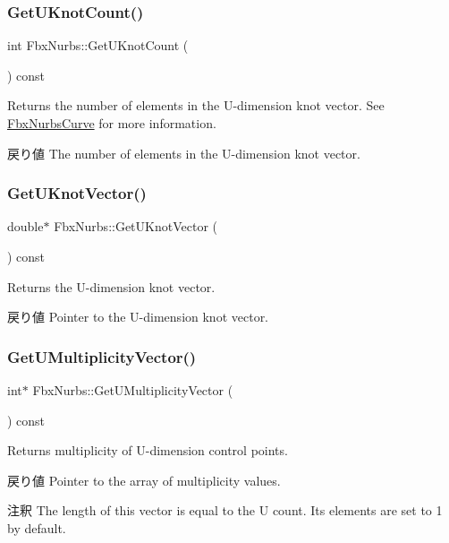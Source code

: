 \subsubsection{\texorpdfstring{Get\+U\+Knot\+Count()}{GetUKnotCount()}}
{\footnotesize\ttfamily int Fbx\+Nurbs\+::\+Get\+U\+Knot\+Count (\begin{DoxyParamCaption}{ }\end{DoxyParamCaption}) const}

Returns the number of elements in the U-\/dimension knot vector. See \hyperlink{class_fbx_nurbs_curve}{Fbx\+Nurbs\+Curve} for more information. \begin{DoxyReturn}{戻り値}
The number of elements in the U-\/dimension knot vector. 
\end{DoxyReturn}
\mbox{\label{class_fbx_nurbs_a114b6f34a8d2438f3916a6ac7e96af2a}} 
\subsubsection{\texorpdfstring{Get\+U\+Knot\+Vector()}{GetUKnotVector()}}
{\footnotesize\ttfamily double$\ast$ Fbx\+Nurbs\+::\+Get\+U\+Knot\+Vector (\begin{DoxyParamCaption}{ }\end{DoxyParamCaption}) const}

Returns the U-\/dimension knot vector. \begin{DoxyReturn}{戻り値}
Pointer to the U-\/dimension knot vector. 
\end{DoxyReturn}
\mbox{\label{class_fbx_nurbs_a0ee516428900821e7d97aa745753d0b4}} 
\subsubsection{\texorpdfstring{Get\+U\+Multiplicity\+Vector()}{GetUMultiplicityVector()}}
{\footnotesize\ttfamily int$\ast$ Fbx\+Nurbs\+::\+Get\+U\+Multiplicity\+Vector (\begin{DoxyParamCaption}{ }\end{DoxyParamCaption}) const}

Returns multiplicity of U-\/dimension control points. \begin{DoxyReturn}{戻り値}
Pointer to the array of multiplicity values. 
\end{DoxyReturn}
\begin{DoxyRemark}{注釈}
The length of this vector is equal to the U count. Its elements are set to 1 by default. 
\end{DoxyRemark}
\mbox{\label{class_fbx_nurbs_a7312be9277b3ca4bf10a723585bd6663}} 
